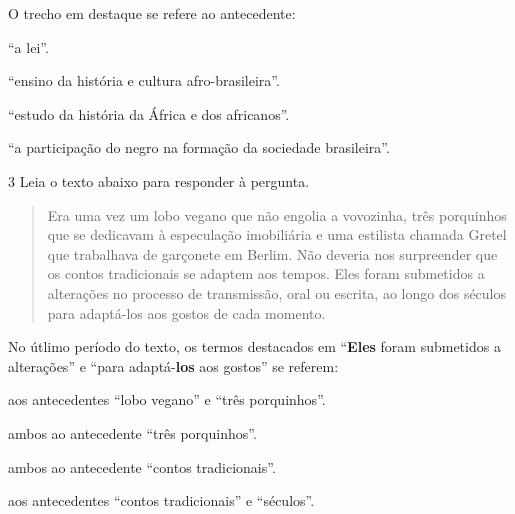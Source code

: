 
O trecho em destaque se refere ao antecedente:

\begin{escolha}
  
  \item ``a lei''.
  
  \item ``ensino da história e cultura afro-brasileira''.
  
  \item ``estudo da história da África e dos africanos''.
  
  \item ``a participação do negro na formação da sociedade brasileira''.

\end{escolha}



\num{3} Leia o texto abaixo para responder à pergunta.

\begin{quote}

Era uma vez um lobo vegano que não engolia a vovozinha, três
porquinhos que se dedicavam à especulação imobiliária e uma estilista
chamada Gretel que trabalhava de garçonete em Berlim. Não deveria nos
surpreender que os contos tradicionais se adaptem aos tempos. Eles foram
submetidos a alterações no processo de transmissão, oral ou escrita, ao
longo dos séculos para adaptá-los aos gostos de cada momento.

\end{quote}



No útlimo período do texto, os termos destacados em ``\textbf{Eles} foram
submetidos a alterações'' e ``para adaptá-\textbf{los} aos gostos'' se referem:

\begin{escolha}

  \item aos antecedentes ``lobo vegano'' e ``três porquinhos''.

  \item ambos ao antecedente ``três porquinhos''. 

  \item ambos ao antecedente ``contos tradicionais''.

  \item aos antecedentes ``contos tradicionais'' e ``séculos''.

\end{escolha}


